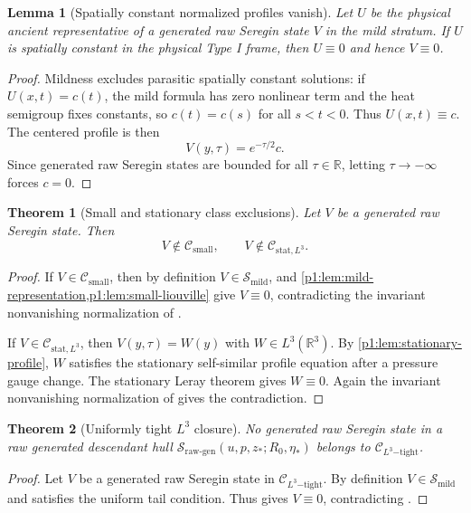 \documentclass[11pt]{amsart}
\theoremstyle{plain}
\newtheorem{theorem}{Theorem}[section]
\newtheorem{lemma}[lemma]{Lemma}
\theoremstyle{definition}
\theoremstyle{remark}
\numberwithin{equation}{section}
\newcommand{\R}{\mathbb R}
\newcommand{\calS}{\mathcal S}
\newcommand{\calC}{\mathcal C}
\begin{document}
\begin{lemma}[Spatially constant normalized profiles vanish]
\label{p1:lem:galilean-trivial-zero}
Let \(U\) be the physical ancient representative of a generated raw Seregin
state \(V\) in the mild stratum.  If \(U\) is spatially constant in the
physical Type I frame, then \(U\equiv0\) and hence \(V\equiv0\).
\end{lemma}

\begin{proof}
Mildness excludes parasitic spatially constant solutions: if
\(U(x,t)=c(t)\), the mild formula has zero nonlinear term and the heat
semigroup fixes constants, so \(c(t)=c(s)\) for all \(s<t<0\).  Thus
\(U(x,t)\equiv c\).  The centered profile is then
\[
   V(y,\tau)=e^{-\tau/2}c .
\]
Since generated raw Seregin states are bounded for all \(\tau\in\R\),
letting \(\tau\to-\infty\) forces \(c=0\).
\end{proof}

\begin{theorem}[Small and stationary class exclusions]
\label{p1:thm:classical-classes}
Let \(V\) be a generated raw Seregin state.  Then
\[
   V\notin \calC_{\mathrm{small}},
   \qquad
   V\notin \calC_{\mathrm{stat},L^3}.
\]
\end{theorem}

\begin{proof}
If \(V\in\calC_{\mathrm{small}}\), then
by definition \(V\in\calS_{\mathrm{mild}}\), and
\cref{p1:lem:mild-representation,p1:lem:small-liouville} give \(V\equiv0\),
contradicting the invariant nonvanishing normalization of
.

If \(V\in\calC_{\mathrm{stat},L^3}\), then
\(V(y,\tau)=W(y)\) with \(W\in L^3(\R^3)\).  By
\cref{p1:lem:stationary-profile}, \(W\) satisfies the stationary self-similar
profile equation after a pressure gauge change.
The stationary Leray theorem  gives \(W\equiv0\).  Again
the invariant nonvanishing normalization of 
gives the contradiction.
\end{proof}

\begin{theorem}[Uniformly tight \(L^3\) closure]
\label{p1:thm:tight-liouville}
No generated raw Seregin state in a raw generated descendant hull
\(\calS_{\mathrm{raw\text{-}gen}}(u,p,z_*;R_0,\eta_*)\) belongs to
\(\calC_{L^3\mathrm{-tight}}\).
\end{theorem}

\begin{proof}
Let \(V\) be a generated raw Seregin state in
\(\calC_{L^3\mathrm{-tight}}\).  By definition
\(V\in\calS_{\mathrm{mild}}\) and satisfies the uniform tail condition.  Thus
 gives \(V\equiv0\), contradicting
.
\end{proof}
\end{document}
